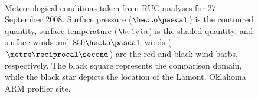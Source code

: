 \begin{figure}[H]
     \begin{center}
%
        \\ %
%
    \end{center}
    \caption{%
        Meteorological conditions taken from RUC analyses for 27 September 2008. Surface pressure ($\hecto\pascal$) is the contoured quantity, surface temperature ($\kelvin$) is the shaded quantity, and surface winds and $850\hecto\pascal$ winds ($\metre\reciprocal\second$) are the red and black wind barbs, respectively. The black square represents the comparison domain, while the black star depicts the location of the Lamont, Oklahoma ARM profiler site.}%
   \label{figure410}
\end{figure}


